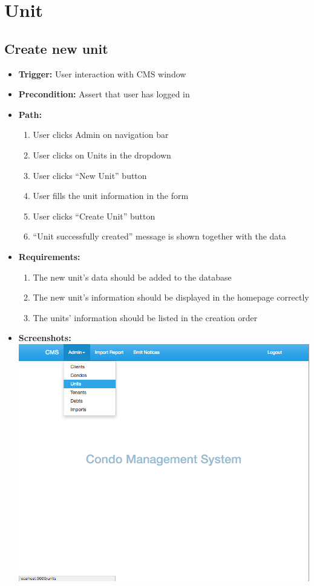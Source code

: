 \section*{Unit}

\subsection*{Create new unit}

\begin{itemize}
  \item[] \textbf{Trigger:} User interaction with CMS window
  \item[] \textbf{Precondition:} Assert that user has logged in
  \item[] \textbf{Path:}
    \begin{enumerate}
      \item User clicks Admin on navigation bar
      \item User clicks on Units in the dropdown
      \item User clicks ``New Unit'' button
      \item User fills the unit information in the form
      \item User clicks ``Create Unit'' button
      \item ``Unit successfully created'' message is shown together with the data
    \end{enumerate}
  \item[] \textbf{Requirements:}
    \begin{enumerate}
      \item The new unit's data should be added to the database
      \item The new unit's information should be displayed in the homepage correctly
      \item The units' information should be listed in the creation order
    \end{enumerate}
  \item[] \textbf{Screenshots:} \\
    \includegraphics[scale=0.25]{./images/ss/unit/create/1.png}

\end{itemize}
